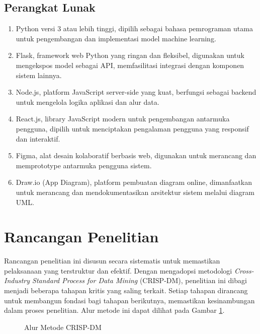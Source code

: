 \subsection{Perangkat Lunak}
\begin{enumerate}
    \item Python versi 3 atau lebih tinggi, dipilih sebagai bahasa pemrograman utama untuk pengembangan dan implementasi model machine learning.
    \item Flask, framework web Python yang ringan dan fleksibel, digunakan untuk mengekspos model sebagai API, memfasilitasi integrasi dengan komponen sistem lainnya.
    \item Node.js, platform JavaScript server-side yang kuat, berfungsi sebagai backend untuk mengelola logika aplikasi dan alur data.
    \item React.js, library JavaScript modern untuk pengembangan antarmuka pengguna, dipilih untuk menciptakan pengalaman pengguna yang responsif dan interaktif.
    \item Figma, alat desain kolaboratif berbasis web, digunakan untuk merancang dan memprototype antarmuka pengguna sistem.
    \item Draw.io (App Diagram), platform pembuatan diagram online, dimanfaatkan untuk merancang dan mendokumentasikan arsitektur sistem melalui diagram UML.
\end{enumerate}

\section{Rancangan Penelitian}
Rancangan penelitian ini disusun secara sistematis untuk memastikan pelaksanaan yang terstruktur dan efektif. Dengan mengadopsi metodologi \textit{Cross-Industry Standard Process for Data Mining} (CRISP-DM), penelitian ini dibagi menjadi beberapa tahapan kritis yang saling terkait. Setiap tahapan dirancang untuk membangun fondasi bagi tahapan berikutnya, memastikan kesinambungan dalam proses penelitian. Alur metode ini dapat dilihat pada Gambar \ref{fig:crisp-dm-overview}.

\begin{figure}[H]
    \centering
    \caption{Alur Metode CRISP-DM \cite{IBM2022}}
    \label{fig:crisp-dm-overview}
\end{figure}

